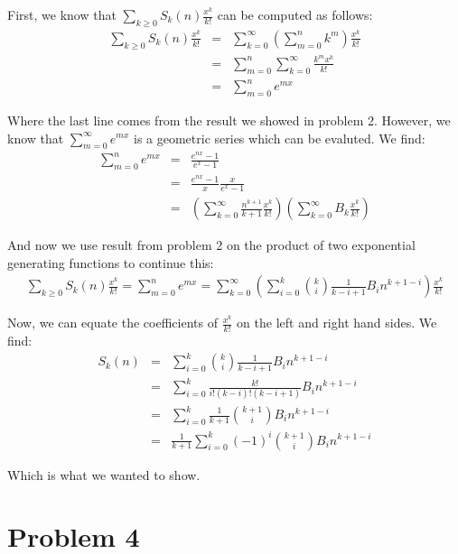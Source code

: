\documentclass[psamsfonts]{amsart}
\newenvironment{sol}{{\bfseries Solution}}{\qedsymbol}
\theoremstyle{definition}
\theoremstyle{remark}
\numberwithin{equation}{section}
\begin{document}
\begin{sol}
First, we know that $\sum_{k \geq 0} S_k(n) \frac{x^k}{k!}$ can be computed as follows:
\begin{eqnarray}
\sum_{k \geq 0} S_k(n) \frac{x^k }{k!} &=& \sum_{k=0}^\infty \left( \sum_{m=0}^n k^m \right) \frac{x^k}{k!} \\
&=& \sum_{m=0}^n \sum_{k=0}^\infty \frac{k^m x^k }{k!} \\
&=& \sum_{m=0}^n e^{mx}
\end{eqnarray}

Where the last line comes from the result we showed in problem 2. However, we know that $\sum_{m=0}^\infty e^{mx}$ is a geometric series which can be evaluted. We find:
\begin{eqnarray}
\sum_{m=0}^n e^{mx} &=& \frac{e^{nx} - 1}{e^x - 1} \\
&=& \frac{e^{nx} - 1}{x} \frac{x}{e^{x} - 1} \\
&=& \left( \sum_{k=0}^\infty \frac{n^{k+1}}{k+1} \frac{x^k}{k!} \right) \left( \sum_{k=0}^\infty B_k \frac{x^k}{k!} \right)
\end{eqnarray}

And now we use result from problem 2 on the product of two exponential generating functions to continue this:
\begin{eqnarray}
\sum_{k \geq 0} S_k(n) \frac{x^k}{k!} = \sum_{m=0}^n e^{mx} = \sum_{k=0}^\infty \left( \sum_{i=0}^k {k \choose i} \frac{1}{k-i+1} B_i n^{k+1-i} \right) \frac{x^k}{k!}
\end{eqnarray}

Now, we can equate the coefficients of $\frac{x^k}{k!}$ on the left and right hand sides. We find:
\begin{eqnarray}
S_k(n) &=& \sum_{i=0}^k {k \choose i} \frac{1}{k-i+1} B_i n^{k+1-i} \\
&=& \sum_{i=0}^k \frac{k!}{i!(k-i)!(k-i+1)} B_i n^{k+1-i} \\
&=& \sum_{i=0}^k \frac{1}{k+1} {k+1 \choose i} B_i n^{k+1-i} \\
&=& \frac{1}{k+1} \sum_{i=0}^k (-1)^i { k + 1 \choose i} B_i n^{k+1 - i} 
\end{eqnarray}

Which is what we wanted to show.
\end{sol}

\section{Problem 4}
\end{document}
